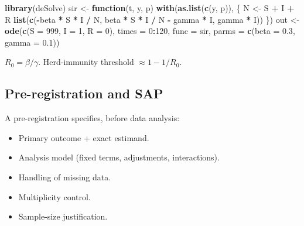\documentclass[
]{article}
\newenvironment{Shaded}{\begin{snugshade}}{\end{snugshade}}
\newcommand{\AttributeTok}[1]{\textcolor[rgb]{0.13,0.29,0.53}{#1}}
\newcommand{\ControlFlowTok}[1]{\textcolor[rgb]{0.13,0.29,0.53}{\textbf{#1}}}
\newcommand{\DecValTok}[1]{\textcolor[rgb]{0.00,0.00,0.81}{#1}}
\newcommand{\FloatTok}[1]{\textcolor[rgb]{0.00,0.00,0.81}{#1}}
\newcommand{\FunctionTok}[1]{\textcolor[rgb]{0.13,0.29,0.53}{\textbf{#1}}}
\newcommand{\NormalTok}[1]{#1}
\newcommand{\OtherTok}[1]{\textcolor[rgb]{0.56,0.35,0.01}{#1}}
\newcommand{\SpecialCharTok}[1]{\textcolor[rgb]{0.81,0.36,0.00}{\textbf{#1}}}
\providecommand{\tightlist}{%
  \setlength{\itemsep}{0pt}\setlength{\parskip}{0pt}}
\begin{document}
\begin{Shaded}
\begin{Highlighting}[]
\FunctionTok{library}\NormalTok{(deSolve)}
\NormalTok{sir }\OtherTok{\textless{}{-}} \ControlFlowTok{function}\NormalTok{(t, y, p) }\FunctionTok{with}\NormalTok{(}\FunctionTok{as.list}\NormalTok{(}\FunctionTok{c}\NormalTok{(y, p)), \{}
\NormalTok{  N }\OtherTok{\textless{}{-}}\NormalTok{ S }\SpecialCharTok{+}\NormalTok{ I }\SpecialCharTok{+}\NormalTok{ R}
  \FunctionTok{list}\NormalTok{(}\FunctionTok{c}\NormalTok{(}\SpecialCharTok{{-}}\NormalTok{beta }\SpecialCharTok{*}\NormalTok{ S }\SpecialCharTok{*}\NormalTok{ I }\SpecialCharTok{/}\NormalTok{ N,}
\NormalTok{          beta }\SpecialCharTok{*}\NormalTok{ S }\SpecialCharTok{*}\NormalTok{ I }\SpecialCharTok{/}\NormalTok{ N }\SpecialCharTok{{-}}\NormalTok{ gamma }\SpecialCharTok{*}\NormalTok{ I,}
\NormalTok{          gamma }\SpecialCharTok{*}\NormalTok{ I))}
\NormalTok{\})}
\NormalTok{out }\OtherTok{\textless{}{-}} \FunctionTok{ode}\NormalTok{(}\FunctionTok{c}\NormalTok{(}\AttributeTok{S =} \DecValTok{999}\NormalTok{, }\AttributeTok{I =} \DecValTok{1}\NormalTok{, }\AttributeTok{R =} \DecValTok{0}\NormalTok{),}
           \AttributeTok{times =} \DecValTok{0}\SpecialCharTok{:}\DecValTok{120}\NormalTok{,}
           \AttributeTok{func =}\NormalTok{ sir,}
           \AttributeTok{parms =} \FunctionTok{c}\NormalTok{(}\AttributeTok{beta =} \FloatTok{0.3}\NormalTok{, }\AttributeTok{gamma =} \FloatTok{0.1}\NormalTok{))}
\end{Highlighting}
\end{Shaded}

\(R_0 = \beta / \gamma\). Herd-immunity threshold \(\approx 1 - 1/R_0\).

\subsection{Pre-registration and SAP}\label{pre-registration-and-sap}

A pre-registration specifies, before data analysis:

\begin{itemize}
\tightlist
\item
  Primary outcome + exact estimand.
\item
  Analysis model (fixed terms, adjustments, interactions).
\item
  Handling of missing data.
\item
  Multiplicity control.
\item
  Sample-size justification.
\end{itemize}
\end{document}
